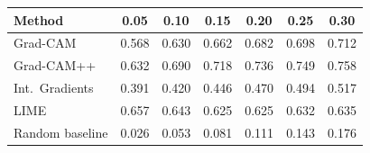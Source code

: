 \begin{tabular}{lcccccc}
\toprule
\textbf{Method} & 0.05 & 0.10 & 0.15 & 0.20 & 0.25 & 0.30 \\
\midrule
Grad-CAM & 0.568 & 0.630 & 0.662 & 0.682 & 0.698 & 0.712 \\
Grad-CAM++ & 0.632 & 0.690 & 0.718 & 0.736 & 0.749 & 0.758 \\
Int.\ Gradients & 0.391 & 0.420 & 0.446 & 0.470 & 0.494 & 0.517 \\
LIME & 0.657 & 0.643 & 0.625 & 0.625 & 0.632 & 0.635 \\
\midrule
Random baseline & 0.026 & 0.053 & 0.081 & 0.111 & 0.143 & 0.176 \\
\bottomrule
\end{tabular}
